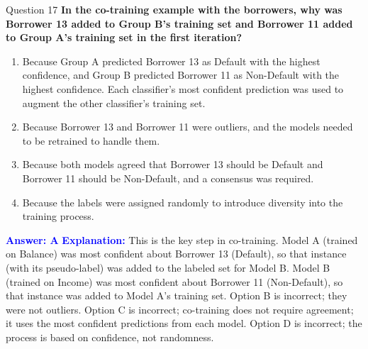 \documentclass{beamer}
\begin{document}
	\begin{frame}{Question 17}
		\textbf{In the co-training example with the borrowers, why was Borrower 13 added to Group B's training set and Borrower 11 added to Group A's training set in the first iteration?}
		\begin{enumerate}
			\item Because Group A predicted Borrower 13 as Default with the highest confidence, and Group B predicted Borrower 11 as Non-Default with the highest confidence. Each classifier's most confident prediction was used to augment the other classifier's training set.
			\item Because Borrower 13 and Borrower 11 were outliers, and the models needed to be retrained to handle them.
			\item Because both models agreed that Borrower 13 should be Default and Borrower 11 should be Non-Default, and a consensus was required.
			\item Because the labels were assigned randomly to introduce diversity into the training process.
		\end{enumerate}
		\vspace{0.2cm}
		\textcolor{blue}{\textbf{Answer: A}}
		\vspace{0.2cm}
		\textcolor{blue}{\textbf{Explanation:}} This is the key step in co-training. Model A (trained on Balance) was most confident about Borrower 13 (Default), so that instance (with its pseudo-label) was added to the labeled set for Model B. Model B (trained on Income) was most confident about Borrower 11 (Non-Default), so that instance was added to Model A's training set. Option B is incorrect; they were not outliers. Option C is incorrect; co-training does not require agreement; it uses the most confident predictions from each model. Option D is incorrect; the process is based on confidence, not randomness.
	\end{frame}
	
\end{document}
